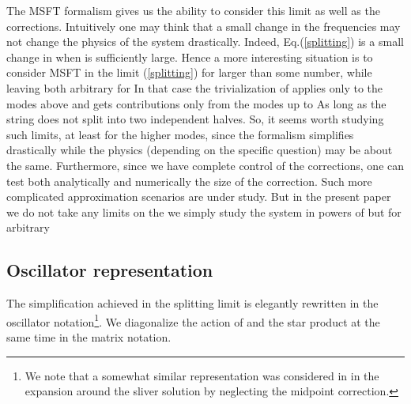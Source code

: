 \documentclass[a4paper,aps,preprint,nofootinbib,eqsecnum]{revtex4}
\begin{document}
The MSFT formalism gives us the ability to consider this limit as well as
the corrections. Intuitively one may think that a small change in the
frequencies may not change the physics of the system drastically. Indeed,
Eq.(\ref{splitting}) is a small change in \coordHE{} when \coordHE{} is
sufficiently large. Hence a more interesting situation is to consider MSFT
in the limit (\ref{splitting}) for \coordHE{} larger than some number, \coordHE{} while
leaving both \coordHE{} arbitrary for \coordHE{} In that
case the trivialization of \coordHE{} applies only to the modes above \coordHE{} and
\myHighlight{$\gamma $}\coordHE{} gets contributions only from the modes up to \coordHE{} As long as \coordHE{} the string does not split into two independent halves. So, it
seems worth studying such limits, at least for the higher modes, since the
formalism simplifies drastically while the physics (depending on the
specific question) may be about the same. Furthermore, since we have
complete control of the corrections, one can test both analytically and
numerically the size of the correction. Such more complicated approximation
scenarios are under study. But in the present paper we do not take any
limits on the \coordHE{} we simply study the system in
powers of \myHighlight{$\gamma $}\coordHE{} but for arbitrary \coordHE{}


\subsection{Oscillator representation}

\label{s:matrix} %


The simplification achieved in the splitting limit is elegantly rewritten in
the oscillator notation\footnote{%
We note that a somewhat similar representation was considered in \cite%
{Okuyama_et_al} in the expansion around the sliver solution by neglecting
the midpoint correction.}. We diagonalize the action of \coordHE{}
and the star product at the same time in the matrix notation.
\end{document}

